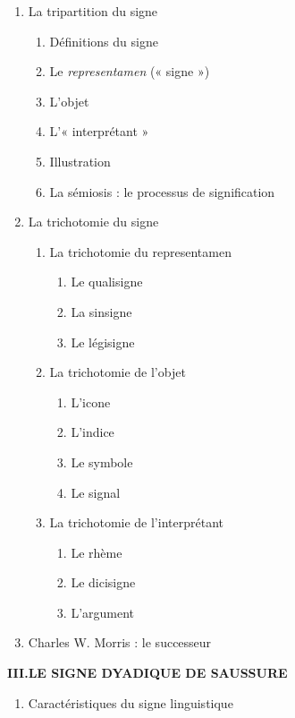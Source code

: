 \begin{keybox}
\begin{enumerate}[label=\arabic*.]
\begin{enumerate}[label=\textcircled{\scriptsize\arabic*}]
\end{enumerate}
\item La tripartition du signe
\begin{enumerate}[label=\textcircled{\scriptsize\arabic*}]
\item Définitions du signe
\item Le \textit{representamen} (« signe »)
\item L’objet
\item L’« interprétant »
\item Illustration
\item La sémiosis : le processus de signification
\end{enumerate}
\item La trichotomie du signe
\begin{enumerate}[label=\textcircled{\scriptsize\arabic*}]
\item La trichotomie du representamen
\begin{enumerate}[label=\arabic*.]
\item Le qualisigne
\item La sinsigne
\item Le légisigne
\end{enumerate}
\item La trichotomie de l’objet
\begin{enumerate}[label=\arabic*.]
\item L’icone
\item L’indice
\item Le symbole
\item Le signal
\end{enumerate}
\item La trichotomie de l’interprétant
\begin{enumerate}[label=\arabic*.]
\item Le rhème
\item Le dicisigne
\item L’argument
\end{enumerate}
\end{enumerate}
\item Charles W. Morris : le successeur
\end{enumerate}
\textbf{III.\quad LE SIGNE DYADIQUE DE SAUSSURE}
\begin{enumerate}[label=\arabic*.]
\item Caractéristiques du signe linguistique
\begin{enumerate}[label=\textcircled{\scriptsize\arabic*}]

\end{enumerate}
\end{enumerate}
\end{keybox}
